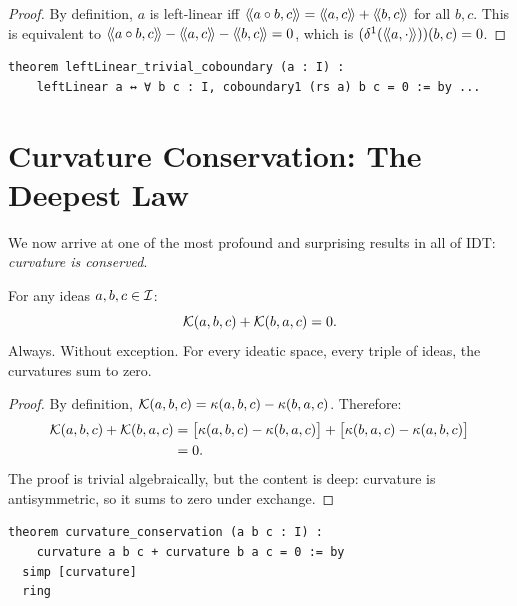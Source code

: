 \begin{proof}
By definition, $a$ is left-linear iff $\langle\!\langle a \circ b, c \rangle\!\rangle = \langle\!\langle a, c \rangle\!\rangle + \langle\!\langle b, c \rangle\!\rangle$
for all $b, c$. This is equivalent to $\langle\!\langle a \circ b, c \rangle\!\rangle - \langle\!\langle a, c \rangle\!\rangle - \langle\!\langle b, c \rangle\!\rangle = 0$,
which is $(\delta^1(\langle\!\langle a, \cdot \rangle\!\rangle))(b,c) = 0$.
\end{proof}

\begin{lstlisting}[caption={Left-linear coboundary (IDT\_v3\_Emergence.lean)}]
theorem leftLinear_trivial_coboundary (a : I) :
    leftLinear a ↔ ∀ b c : I, coboundary1 (rs a) b c = 0 := by ...
\end{lstlisting}


\section{Curvature Conservation: The Deepest Law}

We now arrive at one of the most profound and surprising results in all of IDT:
\emph{curvature is conserved}.

\begin{theorem}
\label{thm:curvature-conservation}
For any ideas $a, b, c \in \mathcal{I}$:
\[
  \mathcal{K}(a,b,c) + \mathcal{K}(b,a,c) = 0.
\]
Always. Without exception. For every ideatic space, every triple of ideas,
the curvatures sum to zero.
\end{theorem}

\begin{proof}
By definition, $\mathcal{K}(a,b,c) = \kappa(a,b,c) - \kappa(b,a,c)$. Therefore:
\begin{align*}
\mathcal{K}(a,b,c) + \mathcal{K}(b,a,c) &= \bigl[\kappa(a,b,c) - \kappa(b,a,c)\bigr]
  + \bigl[\kappa(b,a,c) - \kappa(a,b,c)\bigr] \\
&= 0.
\end{align*}
The proof is trivial algebraically, but the content is deep: curvature is
antisymmetric, so it sums to zero under exchange.
\end{proof}

\begin{lstlisting}[caption={Curvature conservation (IDT\_v3\_Emergence.lean)}]
theorem curvature_conservation (a b c : I) :
    curvature a b c + curvature b a c = 0 := by
  simp [curvature]
  ring
\end{lstlisting}

